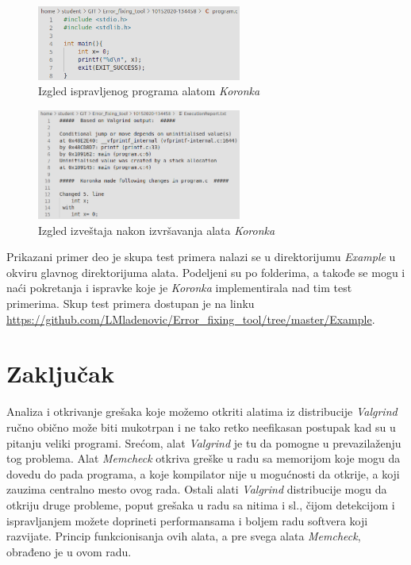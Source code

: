 \documentclass[12pt,oneside]{memoir}
\theoremstyle{plain}
\theoremstyle{definition}
\begin{document}
\begin{figure}[!ht]
  \centering
  \includegraphics[width=0.6\textwidth]{FixedProgram.png}
  \caption{Izgled ispravljenog programa alatom \textit{Koronka}}
  \label{fig:slika4.13}
\end{figure}

\begin{figure}[!ht]
  \centering
  \includegraphics[width=0.6\textwidth]{ExecutionReport.png}
  \caption{Izgled izveštaja nakon izvršavanja alata \textit{Koronka}}
  \label{fig:slika4.14}
\end{figure}

Prikazani primer deo je skupa test primera nalazi se u direktorijumu \textit{Example} u okviru glavnog direktorijuma alata. Podeljeni su po folderima, a takođe se mogu i naći pokretanja i ispravke koje je \textit{Koronka} implementirala nad tim test primerima. Skup test primera dostupan je na linku \url{https://github.com/LMladenovic/Error_fixing_tool/tree/master/Example}. 


\chapter{Zaključak}
Analiza i otkrivanje grešaka koje možemo otkriti alatima iz distribucije \textit{Valgrind} ručno obično može biti mukotrpan i ne tako retko neefikasan postupak kad su u pitanju veliki programi. Srećom, alat \textit{Valgrind} je tu da pomogne u prevazilaženju tog problema. Alat \textit{Memcheck} otkriva greške u radu sa memorijom koje mogu da dovedu do pada programa, a koje kompilator nije u mogućnosti da otkrije, a koji zauzima centralno mesto ovog rada. Ostali alati \textit{Valgrind} distribucije mogu da otkriju druge probleme, poput grešaka u radu sa nitima i sl., čijom detekcijom i ispravljanjem možete doprineti performansama i boljem radu softvera koji razvijate. Princip funkcionisanja ovih alata, a pre svega alata \textit{Memcheck}, obrađeno je u ovom radu. 
\end{document}
